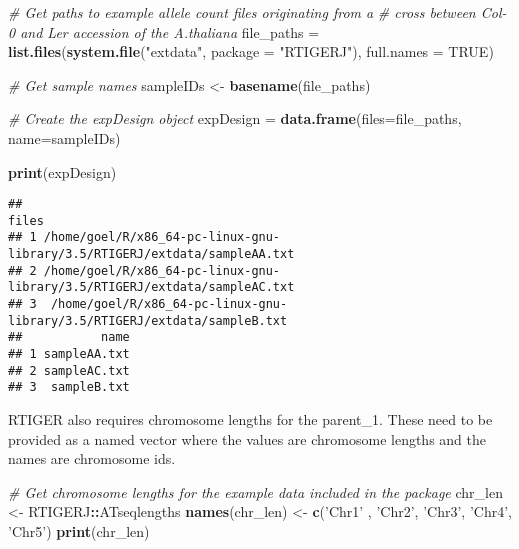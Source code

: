 \documentclass[]{article}
\newenvironment{Shaded}{\begin{snugshade}}{\end{snugshade}}
\newcommand{\CommentTok}[1]{\textcolor[rgb]{0.56,0.35,0.01}{\textit{#1}}}
\newcommand{\DataTypeTok}[1]{\textcolor[rgb]{0.13,0.29,0.53}{#1}}
\newcommand{\KeywordTok}[1]{\textcolor[rgb]{0.13,0.29,0.53}{\textbf{#1}}}
\newcommand{\NormalTok}[1]{#1}
\newcommand{\OperatorTok}[1]{\textcolor[rgb]{0.81,0.36,0.00}{\textbf{#1}}}
\newcommand{\OtherTok}[1]{\textcolor[rgb]{0.56,0.35,0.01}{#1}}
\newcommand{\StringTok}[1]{\textcolor[rgb]{0.31,0.60,0.02}{#1}}
\begin{document}
\begin{Shaded}
\begin{Highlighting}[]
\CommentTok{# Get paths to example allele count files originating from a}
\CommentTok{# cross between Col-0 and Ler accession of the A.thaliana}
\NormalTok{file_paths =}\StringTok{ }\KeywordTok{list.files}\NormalTok{(}\KeywordTok{system.file}\NormalTok{(}\StringTok{"extdata"}\NormalTok{,  }\DataTypeTok{package =} \StringTok{"RTIGERJ"}\NormalTok{), }\DataTypeTok{full.names =} \OtherTok{TRUE}\NormalTok{)}

\CommentTok{# Get sample names}
\NormalTok{sampleIDs <-}\StringTok{ }\KeywordTok{basename}\NormalTok{(file_paths)}

\CommentTok{# Create the expDesign object}
\NormalTok{expDesign =}\StringTok{ }\KeywordTok{data.frame}\NormalTok{(}\DataTypeTok{files=}\NormalTok{file_paths, }\DataTypeTok{name=}\NormalTok{sampleIDs)}

\KeywordTok{print}\NormalTok{(expDesign)}
\end{Highlighting}
\end{Shaded}

\begin{verbatim}
##                                                                       files
## 1 /home/goel/R/x86_64-pc-linux-gnu-library/3.5/RTIGERJ/extdata/sampleAA.txt
## 2 /home/goel/R/x86_64-pc-linux-gnu-library/3.5/RTIGERJ/extdata/sampleAC.txt
## 3  /home/goel/R/x86_64-pc-linux-gnu-library/3.5/RTIGERJ/extdata/sampleB.txt
##           name
## 1 sampleAA.txt
## 2 sampleAC.txt
## 3  sampleB.txt
\end{verbatim}

RTIGER also requires chromosome lengths for the parent\_1. These need to
be provided as a named vector where the values are chromosome lengths
and the names are chromosome ids.

\begin{Shaded}
\begin{Highlighting}[]
\CommentTok{# Get chromosome lengths for the example data included in the package}
\NormalTok{chr_len <-}\StringTok{ }\NormalTok{RTIGERJ}\OperatorTok{::}\NormalTok{ATseqlengths}
\KeywordTok{names}\NormalTok{(chr_len) <-}\StringTok{ }\KeywordTok{c}\NormalTok{(}\StringTok{'Chr1'}\NormalTok{ , }\StringTok{'Chr2'}\NormalTok{, }\StringTok{'Chr3'}\NormalTok{, }\StringTok{'Chr4'}\NormalTok{, }\StringTok{'Chr5'}\NormalTok{)}
\KeywordTok{print}\NormalTok{(chr_len)}
\end{Highlighting}
\end{Shaded}
\end{document}
